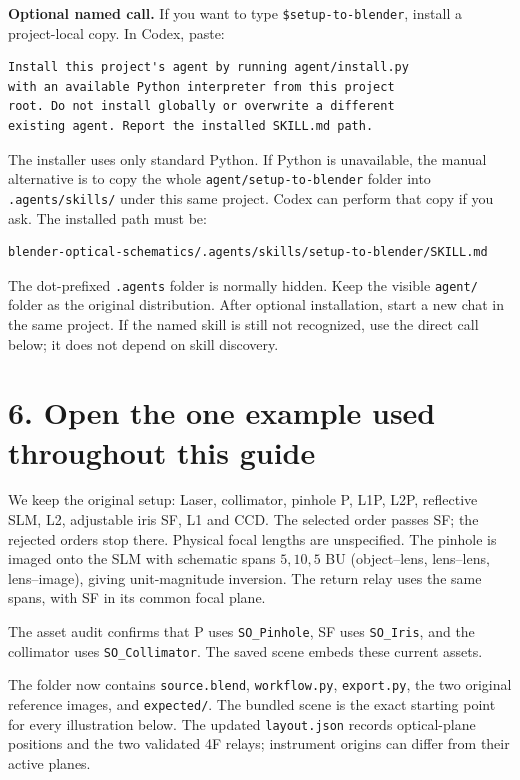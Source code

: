 \documentclass[11pt,a4paper]{article}
\begin{document}
\textbf{Optional named call.} If you want to type \texttt{\$setup-to-blender}, install a project-local copy. In Codex, paste:
\begin{Verbatim}[fontsize=\small]
Install this project's agent by running agent/install.py
with an available Python interpreter from this project
root. Do not install globally or overwrite a different
existing agent. Report the installed SKILL.md path.
\end{Verbatim}
The installer uses only standard Python. If Python is unavailable, the manual alternative is to copy the whole \texttt{agent/setup-to-blender} folder into \texttt{.agents/skills/} under this same project. Codex can perform that copy if you ask. The installed path must be:
\begin{Verbatim}[fontsize=\small]
blender-optical-schematics/.agents/skills/setup-to-blender/SKILL.md
\end{Verbatim}
The dot-prefixed \texttt{.agents} folder is normally hidden. Keep the visible \texttt{agent/} folder as the original distribution. After optional installation, start a new chat in the same project. If the named skill is still not recognized, use the direct call below; it does not depend on skill discovery.

\clearpage
\section*{6. Open the one example used throughout this guide}
We keep the original setup: Laser, collimator, pinhole P, L1P, L2P, reflective SLM, L2, adjustable iris SF, L1 and CCD. The selected order passes SF; the rejected orders stop there. Physical focal lengths are unspecified. The pinhole is imaged onto the SLM with schematic spans $5,10,5$ BU (object--lens, lens--lens, lens--image), giving unit-magnitude inversion. The return relay uses the same spans, with SF in its common focal plane.

The asset audit confirms that P uses \texttt{SO\_Pinhole}, SF uses \texttt{SO\_Iris}, and the collimator uses \texttt{SO\_Collimator}. The saved scene embeds these current assets.

The folder  now contains \texttt{source.blend}, \texttt{workflow.py}, \texttt{export.py}, the two original reference images, and \texttt{expected/}. The bundled scene is the exact starting point for every illustration below. The updated \texttt{layout.json} records optical-plane positions and the two validated 4F relays; instrument origins can differ from their active planes.
\end{document}
